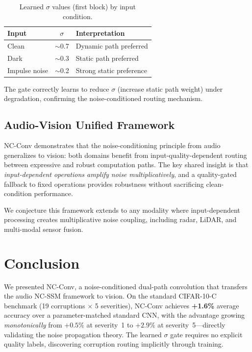 \documentclass{bmvc2k}
\begin{document}
\begin{table}[h]
\centering
\caption{Learned $\sigma$ values (first block) by input condition.}
\label{tab:sigma_values}
\small
\begin{tabular}{@{}lc l@{}}
\toprule
\textbf{Input} & $\sigma$ & \textbf{Interpretation} \\
\midrule
Clean         & $\sim$0.7 & Dynamic path preferred \\
Dark          & $\sim$0.3 & Static path preferred \\
Impulse noise & $\sim$0.2 & Strong static preference \\
\bottomrule
\end{tabular}
\end{table}

The gate correctly learns to reduce $\sigma$ (increase static path weight) under degradation, confirming the noise-conditioned routing mechanism.

\subsection{Audio-Vision Unified Framework}

NC-Conv demonstrates that the noise-conditioning principle from audio~\cite{choi2026ncssm} generalizes to vision:
both domains benefit from input-quality-dependent routing between expressive and robust computation paths.
The key shared insight is that \emph{input-dependent operations amplify noise multiplicatively}, and a quality-gated fallback to fixed operations provides robustness without sacrificing clean-condition performance.

We conjecture this framework extends to any modality where input-dependent processing creates multiplicative noise coupling, including radar, LiDAR, and multi-modal sensor fusion.


\section{Conclusion}
\label{sec:conclusion}

We presented NC-Conv, a noise-conditioned dual-path convolution that transfers the audio NC-SSM framework to vision.
On the standard CIFAR-10-C benchmark (19 corruptions $\times$ 5 severities), NC-Conv achieves \textbf{+1.6\%} average accuracy over a parameter-matched standard CNN, with the advantage growing \emph{monotonically} from $+0.5\%$ at severity~1 to $+2.9\%$ at severity~5---directly validating the noise propagation theory.
The learned $\sigma$ gate requires no explicit quality labels, discovering corruption routing implicitly through training.
\end{document}
